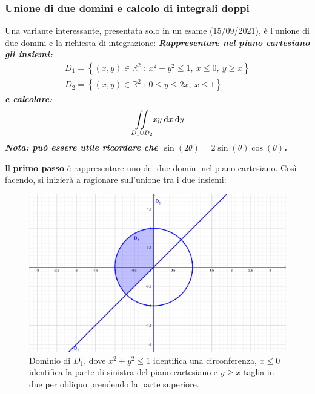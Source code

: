 \documentclass[a4paper]{article}
\begin{document}
	\subsubsection{Unione di due domini e calcolo di integrali doppi}

	Una variante interessante, presentata solo in un esame (15/09/2021), è l'unione di due domini e la richiesta di integrazione: \textcolor{Green4}{\textbf{\emph{Rappresentare nel piano cartesiano gli insiemi:}}
	\begin{gather*}
		D_{1} = \left\{\left(x,y\right) \in \mathbb{R}^{2} \: : \: x^{2} + y^{2} \le 1, \: x \le 0, \: y \ge x\right\} \\
		D_{2} = \left\{\left(x,y\right) \in \mathbb{R}^{2} \: : \: 0 \le y \le 2x, \: x \le 1\right\}
	\end{gather*}
	\textbf{\emph{e calcolare:}}
	\begin{equation*}
		\underset{D_{1} \cup D_{2}}{\int\hspace{-.5em}\int} xy \: \mathrm{d}x \: \mathrm{d}y
	\end{equation*}
	\textbf{\emph{Nota: può essere utile ricordare che $\sin\left(2\theta\right) = 2 \sin\left(\theta\right)\cos\left(\theta\right)$.}}}\newline
	
	\noindent
	Il \textbf{primo passo} è rappresentare uno dei due domini nel piano cartesiano. Così facendo, si inizierà a ragionare sull'unione tra i due insiemi:
	\begin{figure}[!htp]
		\centering
		\includegraphics[width=.95\textwidth]{img/grafico-ex6-8.pdf}
		\caption*{Dominio di $D_{1}$, dove $x^{2} + y^{2} \le 1$ identifica una circonferenza, $x \le 0$ identifica la parte di sinistra del piano cartesiano e $y \ge x$ taglia in due per obliquo prendendo la parte superiore.}
	\end{figure}\newpage
\end{document}
